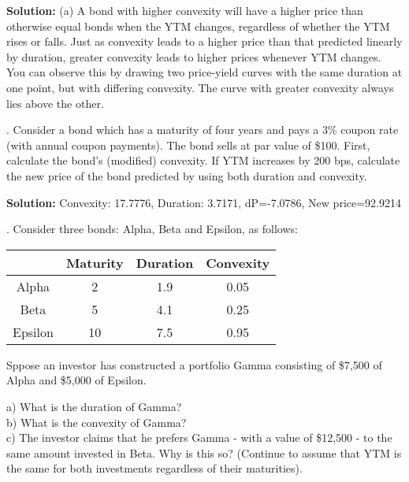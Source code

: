 \documentclass[11.5pt]{article}
\begin{document}
\noindent \textbf{Solution:} (a) A bond with higher convexity will have a higher price than otherwise equal bonds when the YTM changes, regardless of whether the YTM rises or falls. Just as convexity leads to a higher price than that predicted linearly by duration, greater convexity leads to higher prices whenever YTM changes. You can observe this by drawing two price-yield curves with the same duration at one point, but with differing convexity. The curve with greater convexity always lies above the other.



\vspace{30pt}




. Consider a bond which has a maturity of four years and pays a 3\% coupon rate (with annual coupon payments). The bond sells at par value of \$100. First, calculate the bond's (modified) convexity. If YTM increases by 200 bps, calculate the new price of the bond predicted by using both duration and convexity.


\noindent \textbf{Solution:} Convexity: 17.7776, Duration: 3.7171, dP=-7.0786, New price=92.9214



\vspace{50pt}




. Consider three bonds: Alpha, Beta and Epsilon, as follows:

\begin{table}[h]
	\begin{tabular}{cccc}
		& Maturity & Duration & Convexity \\ \hline
		Alpha   & 2        & 1.9      & 0.05      \\
		Beta    & 5        & 4.1      & 0.25      \\
		Epsilon & 10       & 7.5      & 0.95   \\  \hline
	\end{tabular}
\end{table}

\noindent Sppose an investor has constructed a portfolio Gamma consisting of \$7,500 of Alpha and \$5,000 of Epsilon. 

\noindent a) What is the duration of Gamma? \\
b) What is the convexity of Gamma? \\
c) The investor claims that he prefers Gamma - with a value of \$12,500 - to the same amount invested in Beta. Why is this so? (Continue to assume that YTM is the same for both investments regardless of their maturities).
\end{document}
